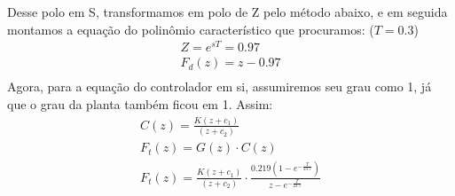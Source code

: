 \documentclass[
	article,			%
	11pt,				%
	oneside,			%
	a4paper,			%
	section=TITLE,		%
	english,			%
	brazil,				%
	sumario=tradicional
	]{abntex2}
\begin{document}
Desse polo em S, transformamos em polo de Z pelo método abaixo, e em seguida montamos a equação do polinômio característico que procuramos: ($T=0.3$)
\begin{equation}
\begin{split}
    Z=e^{sT}=0.97 \\
    F_d(z)=z-0.97 \\
\end{split}
\end{equation}
Agora, para a equação do controlador em si, assumiremos seu grau como 1, já que o grau da planta também ficou em 1. Assim:
\begin{equation}
\begin{split}
    C(z)=\frac{K(z+c_1)}{(z+c_2)} \\
    F_t(z)=G(z) \cdot C(z) \\
    F_t(z)=\frac{K(z+c_1)}{(z+c_2)} \cdot \frac{0.219(1-e^{-\frac{T}{23.7}})} {z-e^{-\frac{T}{23.7}}} \\
\end{split}
\end{equation}
\end{document}
